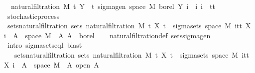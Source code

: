 \begin{isabellebody}
\ \ {\isachardoublequoteopen}natural{\isacharunderscore}{\kern0pt}filtration\ M\ t\ Y\ {\isacharequal}{\kern0pt}\ {\isacharparenleft}{\kern0pt}{\isasymlambda}t{\isachardot}{\kern0pt}\ sigma{\isacharunderscore}{\kern0pt}gen\ {\isacharparenleft}{\kern0pt}space\ M{\isacharparenright}{\kern0pt}\ borel\ {\isacharbraceleft}{\kern0pt}Y\ i\ {\isacharbar}{\kern0pt}\ i{\isachardot}{\kern0pt}\ i\ {\isasymin}\ {\isacharbraceleft}{\kern0pt}tt{\isacharbraceright}{\kern0pt}{\isacharbraceright}{\kern0pt}{\isacharparenright}{\kern0pt}{\isachardoublequoteclose}\isanewline
\isanewline
{}\isamarkupfalse%
\ stochastic{\isacharunderscore}{\kern0pt}process\isanewline
{}\isanewline
\isanewline
{}\isamarkupfalse%
\ sets{\isacharunderscore}{\kern0pt}natural{\isacharunderscore}{\kern0pt}filtration{\isacharprime}{\kern0pt}{\isacharcolon}{\kern0pt}\ {\isachardoublequoteopen}sets\ {\isacharparenleft}{\kern0pt}natural{\isacharunderscore}{\kern0pt}filtration\ M\ t\ X\ t{\isacharparenright}{\kern0pt}\ {\isacharequal}{\kern0pt}\ sigma{\isacharunderscore}{\kern0pt}sets\ {\isacharparenleft}{\kern0pt}space\ M{\isacharparenright}{\kern0pt}\ {\isacharparenleft}{\kern0pt}{\isasymUnion}i{\isasymin}{\isacharbraceleft}{\kern0pt}tt{\isacharbraceright}{\kern0pt}{\isachardot}{\kern0pt}\ {\isacharbraceleft}{\kern0pt}X\ i\ {\isacharminus}{\kern0pt}{\isacharbackquote}{\kern0pt}\ A\ {\isasyminter}\ space\ M\ {\isacharbar}{\kern0pt}\ A{\isachardot}{\kern0pt}\ A\ {\isasymin}\ borel{\isacharbraceright}{\kern0pt}{\isacharparenright}{\kern0pt}{\isachardoublequoteclose}\isanewline
%
\isadelimproof
\ \ %
\endisadelimproof
%
\isatagproof
{}\isamarkupfalse%
\ natural{\isacharunderscore}{\kern0pt}filtration{\isacharunderscore}{\kern0pt}def\ sets{\isacharunderscore}{\kern0pt}sigma{\isacharunderscore}{\kern0pt}gen\ \isamarkupfalse%
\ {\isacharparenleft}{\kern0pt}intro\ sigma{\isacharunderscore}{\kern0pt}sets{\isacharunderscore}{\kern0pt}eqI{\isacharparenright}{\kern0pt}\ blast{\isacharplus}{\kern0pt}%
\endisatagproof
{\isafoldproof}%
%
\isadelimproof
\isanewline
%
\endisadelimproof
\isanewline
{}\isamarkupfalse%
\isanewline
\ \ \ sets{\isacharunderscore}{\kern0pt}natural{\isacharunderscore}{\kern0pt}filtration{\isacharcolon}{\kern0pt}\ {\isachardoublequoteopen}sets\ {\isacharparenleft}{\kern0pt}natural{\isacharunderscore}{\kern0pt}filtration\ M\ t\ X\ t{\isacharparenright}{\kern0pt}\ {\isacharequal}{\kern0pt}\ sigma{\isacharunderscore}{\kern0pt}sets\ {\isacharparenleft}{\kern0pt}space\ M{\isacharparenright}{\kern0pt}\ {\isacharparenleft}{\kern0pt}{\isasymUnion}i{\isasymin}{\isacharbraceleft}{\kern0pt}tt{\isacharbraceright}{\kern0pt}{\isachardot}{\kern0pt}\ {\isacharbraceleft}{\kern0pt}X\ i\ {\isacharminus}{\kern0pt}{\isacharbackquote}{\kern0pt}\ A\ {\isasyminter}\ space\ M\ {\isacharbar}{\kern0pt}\ A{\isachardot}{\kern0pt}\ open\ A{\isacharbraceright}{\kern0pt}{\isacharparenright}{\kern0pt}{\isachardoublequoteclose}\ \isanewline

\end{isabellebody}
